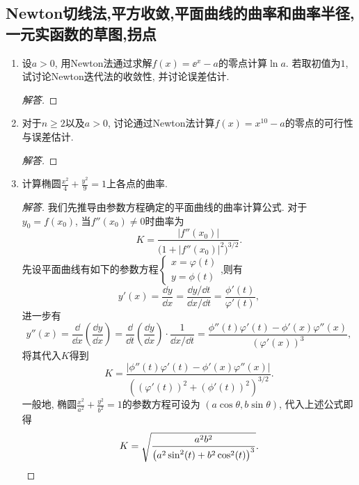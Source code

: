 \subsection{Newton切线法,平方收敛,平面曲线的曲率和曲率半径,一元实函数的草图,拐点}
\begin{4a}
\begin{enumerate}
\item 设\(a>0\), 用Newton法通过求解\(f(x)=\ee^x-a\)的零点计算\(\ln a\). 
若取初值为\(1\), 试讨论Newton迭代法的收敛性, 并讨论误差估计.
\begin{proof}[解答]

\end{proof}

\item 对于\(n\geqslant 2\)以及\(a>0\), 
讨论通过Newton法计算\(f(x)=x^{10}-a\)的零点的可行性与误差估计.
\begin{proof}[解答]

\end{proof}

\item 计算椭圆\(\frac{x^2}{4}+\frac{y^2}{9}=1\)上各点的曲率.
\begin{proof}[解答]
我们先推导由参数方程确定的平面曲线的曲率计算公式. 
对于\(y_0=f(x_0)\), 当\(f''(x_0)\ne 0\)时曲率为
\[K=\frac{|f''(x_0)|}{\big(1+|f''(x_0)|^2\big)^{3/2}}.\]
先设平面曲线有如下的参数方程\(\begin{cases}
x=\varphi(t)\\
y=\phi(t)
\end{cases}\),则有\[y'(x)=\frac{\dd y}{\dd x}
=\frac{\dd y/\dd t}{\dd x/\dd t}=\frac{\phi'(t)}{\varphi'(t)},\]进一步有
\[y''(x)=\frac{\dd}{\dd x}\left(\frac{\dd y}{\dd x}\right)
=\frac{\dd}{\dd t}\left(\frac{\dd y}{\dd x}\right)\cdot\frac{1}{\dd x/\dd t}
=\frac{\phi''(t)\varphi'(t)-\phi'(x)\varphi''(x)}{\left(\varphi'(x)\right)^3},\]
将其代入\(K\)得到\[K=\frac{|\phi''(t)\varphi'(t)-\phi'(x)\varphi''(x)|}{\left(\left(\varphi'(t)\right)^2+\left(\phi'(t)\right)^2\right)^{3/2}}.\]
一般地, 椭圆\(\frac{x^2}{a^2}+\frac{y^2}{b^2}=1\)的参数方程可设为
\(\left(a\cos\theta,b\sin\theta\right)\), 代入上述公式即得
\[K=\sqrt{\frac{a^2b^2}{\left(a^2\sin^2(t)+b^2\cos^2(t)\right)^3}}.\qedhere\]
\end{proof}


\end{enumerate}
\end{4a}
